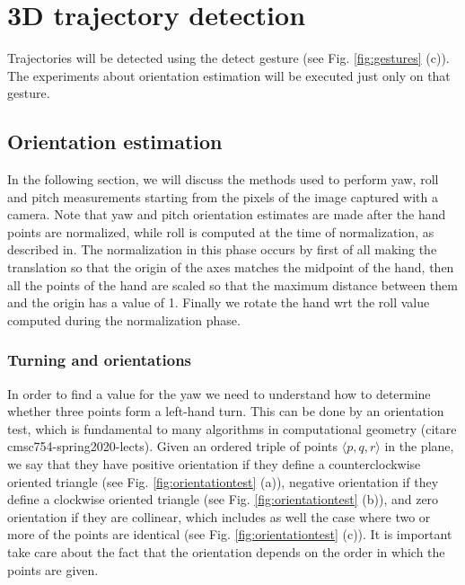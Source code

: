 \section{3D trajectory detection}
\label{sec:3dtraj}
Trajectories will be detected using the detect gesture (see Fig. \ref{fig:gestures} (c)). The experiments about orientation estimation will be executed just only on that gesture. 

\subsection{Orientation estimation}
\label{sec:orientationestimation}
In the following section, we will discuss the methods used to perform yaw, roll and pitch measurements starting from the pixels of the image captured with a camera. Note that yaw and pitch orientation estimates are made after the hand points are normalized, while roll is computed at the time of normalization, as described in. The normalization in this phase occurs by first of all making the translation so that the origin of the axes matches the midpoint of the hand, then all the points of the hand are scaled so that the maximum distance between them and the origin has a value of 1. Finally we rotate the hand \gls{wrt} the roll value computed during the normalization phase.

\subsubsection{Turning and orientations}
\label{subsec:orientationtest}
In order to find a value for the yaw we need to understand how to determine whether three points form a left-hand turn. This can be done by an orientation test, which is fundamental to many algorithms in computational geometry (citare cmsc754-spring2020-lects). Given an ordered triple of points $\langle p, q, r \rangle$ in the plane, we say that they have positive orientation if they define a counterclockwise oriented triangle (see Fig. \ref{fig:orientationtest} (a)), negative orientation if they define a clockwise oriented triangle (see Fig. \ref{fig:orientationtest} (b)), and zero orientation if they are collinear, which includes as well the case where two or more of the points are identical (see Fig. \ref{fig:orientationtest} (c)). It is important take care about the fact that the orientation depends on the order in which the points are given.

